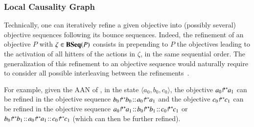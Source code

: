 \subsubsection{Local Causality Graph}


Technically,
one can iteratively refine a given objective into (possibly several) objective
sequences following its bounce sequences.
Indeed, the refinement of an objective $P$ with $\zeta\in\mathbf{BSeq}(P)$
consists in prepending to $P$ the
objectives leading to the activation of all hitters of the actions in $\zeta$,
in the same sequential order.
The generalization of this refinement to an objective sequence would
naturally require to consider all possible
interleaving between the refinements~\cite{PMR12-MSCS}.

For example, given the AAN of ,
in the state $\langle a_0,b_0,c_0\rangle$,
the objective ${a_0\!\Rsh^*\!\!a_1}$ can be refined in the objective sequence
$\obj{b_0}{b_0}\concat\obj{a_0}{a_1}$
and
the objective ${c_0\!\Rsh^*\!\!c_1}$ can be refined in the objective sequence
$\obj{a_0}{a_1}\concat\obj{b_0}{b_1}\concat\obj{c_0}{c_1}$
or
$\obj{b_0}{b_1}\concat\obj{a_0}{a_1}\concat\obj{c_0}{c_1}$
(which can then be further refined).

\medskip

